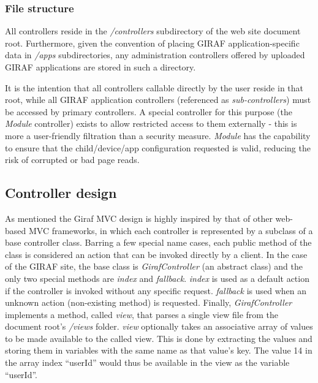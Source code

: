 \subsubsection*{File structure}
All controllers reside in the \emph{/controllers} subdirectory of the web site document root. Furthermore, given the convention of placing GIRAF application-specific data in \emph{/apps} subdirectories, any administration controllers offered by uploaded GIRAF applications are stored in such a directory.

It is the intention that all controllers callable directly by the user reside in that root, while all GIRAF application controllers (referenced as \emph{sub-controllers}) must be accessed by primary controllers. A special controller for this purpose (the \emph{Module} controller) exists to allow restricted access to them externally - this is more a user-friendly filtration than a security measure. \emph{Module} has the capability to ensure that the child/device/app configuration requested is valid, reducing the risk of corrupted or bad page reads.

\subsection{Controller design}
\label{controller_design}
As mentioned the Giraf MVC design is highly inspired by that of other web-based MVC frameworks, in which each controller is represented by a subclass of a base controller class. Barring a few special name cases, each public method of the class is considered an action that can be invoked directly by a client.
In the case of the GIRAF site, the base class is \emph{GirafController} (an abstract class) and the only two special methods are \emph{index} and \emph{fallback}. \emph{index} is used as a default action if the controller is invoked without any specific request. \emph{fallback} is used when an unknown action (non-existing method) is requested.
Finally, \emph{GirafController} implements a method, called \emph{view}, that parses a single view file from the document root's \emph{/views} folder. \emph{view} optionally takes an associative array of values to be made available to the called view. This is done by extracting the values and storing them in variables with the same name as that value's key. The value 14 in the array index ``userId'' would thus be available in the view as the variable ``userId''.

